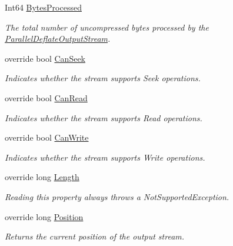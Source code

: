 \begin{DoxyCompactItemize}
Int64 \mbox{\hyperlink{class_super_tiled2_unity_1_1_ionic_1_1_zlib_1_1_parallel_deflate_output_stream_a98bc1a07f316e85f7db5863904783416}{Bytes\+Processed}}
\begin{DoxyCompactList}\small\item\em The total number of uncompressed bytes processed by the \mbox{\hyperlink{class_super_tiled2_unity_1_1_ionic_1_1_zlib_1_1_parallel_deflate_output_stream}{Parallel\+Deflate\+Output\+Stream}}. \end{DoxyCompactList}\item 
override bool \mbox{\hyperlink{class_super_tiled2_unity_1_1_ionic_1_1_zlib_1_1_parallel_deflate_output_stream_a0e307e123c11a5c1e8c03bd62a3f4ef0}{Can\+Seek}}
\begin{DoxyCompactList}\small\item\em Indicates whether the stream supports Seek operations. \end{DoxyCompactList}\item 
override bool \mbox{\hyperlink{class_super_tiled2_unity_1_1_ionic_1_1_zlib_1_1_parallel_deflate_output_stream_aad6e98842854428c17f2664bcd600ee3}{Can\+Read}}
\begin{DoxyCompactList}\small\item\em Indicates whether the stream supports Read operations. \end{DoxyCompactList}\item 
override bool \mbox{\hyperlink{class_super_tiled2_unity_1_1_ionic_1_1_zlib_1_1_parallel_deflate_output_stream_ab8301238c8479b209347a796dc1d104f}{Can\+Write}}
\begin{DoxyCompactList}\small\item\em Indicates whether the stream supports Write operations. \end{DoxyCompactList}\item 
override long \mbox{\hyperlink{class_super_tiled2_unity_1_1_ionic_1_1_zlib_1_1_parallel_deflate_output_stream_a15050442090a1fa7047790fb8dc0ad80}{Length}}
\begin{DoxyCompactList}\small\item\em Reading this property always throws a Not\+Supported\+Exception. \end{DoxyCompactList}\item 
override long \mbox{\hyperlink{class_super_tiled2_unity_1_1_ionic_1_1_zlib_1_1_parallel_deflate_output_stream_a3319643b57f16836e855a048d81f648f}{Position}}
\begin{DoxyCompactList}\small\item\em Returns the current position of the output stream. \end{DoxyCompactList}\end{DoxyCompactItemize}


